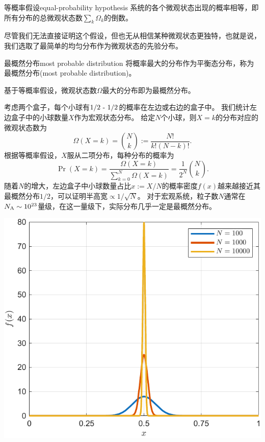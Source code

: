\begin{postulate}
	{等概率假设}{equal-probability hypothesis}
	系统的各个微观状态出现的概率相等，即所有分布的总微观状态数$\textstyle\sum_k\Omega_k$的倒数。
\end{postulate}

\begin{remark}
	尽管我们无法直接证明这个假设，但也无从相信某种微观状态更独特，也就是说，我们选取了最简单的均匀分布作为微观状态的先验分布。
\end{remark}

\begin{postulate}
	{最概然分布}{most probable distribution}
	将概率最大的分布作为平衡态分布，称为最概然分布(most probable distribution)。
\end{postulate}

\begin{corollary}
	基于等概率假设，微观状态数$\Omega$最大的分布即为最概然分布。
\end{corollary}


\begin{example}
	{}{}
	考虑两个盒子，每个小球有$1/2~\text{-}~1/2$的概率在左边或右边的盒子中。
	我们统计左边盒子中的小球数量$X$作为宏观状态分布。
	给定$N$个小球，则$X=k$的分布对应的微观状态数为
	\[
		\Omega(X=k)=\binom Nk:=\frac{N!}{k!(N-k)!}.
	\]
	根据等概率假设，$X$服从二项分布，每种分布的概率为
	\[
		\Pr(X=k)=\frac{\Omega(X=k)}{\sum_{k=0}^N\Omega(X=k)}=\frac1{2^N}\binom Nk.
	\]
	随着$N$的增大，左边盒子中小球数量占比$x:=X/N$的概率密度$f(x)$越来越接近其最概然分布$1/2$，可以证明半高宽$\propto1/\sqrt N$。
	对于宏观系统，粒子数$N$通常在$N_{\mathrm A}\sim10^{23}$量级，在这一量级下，实际分布几乎一定是最概然分布。
	\begin{center}
		\includegraphics[width=0.6\linewidth]{figures/ML_distribution.pdf}
		\label{fig:ML example}
	\end{center}
\end{example}

